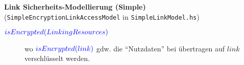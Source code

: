 \documentclass[varwidth=18cm]{standalone}
\begin{document}
\textbf{Link Sicherheits-Modellierung (Simple) } (\texttt{SimpleEncryptionLinkAccessModel} in \texttt{SimpleLinkModel.hs})\\



\begin{description}
  \item[${\color{blue}{isEncrypted(LinkingResources)}}$] wo ${\color{blue}{isEncrypted(link)}}$
       gdw. die \enquote{Nutzdaten} bei übertragen auf $link$ verschlüsselt werden.
\end{description}
\end{document}
